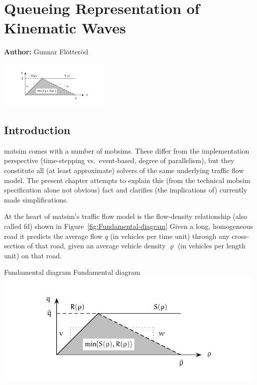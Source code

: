 \chapter{Queueing Representation of Kinematic Waves}
\label{ch:kinematicwaves}

\hfill \textbf{Author:} Gunnar Flötteröd

\begin{center} \includegraphics[width=0.4\textwidth, angle=0]{understanding/figures/waves/fig0.pdf} \end{center}

\section{\label{sec:Introduction}Introduction}

\gls{matsim} comes with a number of \glspl{mobsim}. These differ from the
implementation perspective (time-stepping vs.\ event-based, degree
of parallelism), but they constitute all (at least approximate) solvers
of the same underlying traffic flow model. The present chapter attempts
to explain this (from the technical mobsim specification alone not
obvious) fact and clarifies (the implications of) currently made simplifications.

At the heart of \gls{matsim}'s traffic flow model is the flow-density relationship
(also called \gls{fd}) shown in Figure~\ref{fig:Fundamental-diagram}
Given a long, homogeneous
road it predicts the average flow $q$ (in vehicles per time unit)
through any cross-section of that road, given an average vehicle density
$\varrho$ (in vehicles per length unit) on that road. 

\createfigure%
{Fundamental diagram}%
{Fundamental diagram}%
{\label{fig:Fundamental-diagram}}%
{\includegraphics[width=0.99\textwidth, angle=0]{understanding/figures/waves/fig0.pdf}}%
{}

